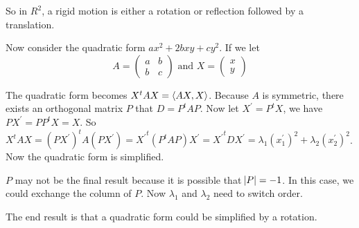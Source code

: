 So in $R^2$, a rigid motion is either a rotation or reflection followed by a translation.

\begin{example}
    Now consider the quadratic form $ax^2 + 2bxy + cy^2$. If we let 
\begin{equation}
    A = \begin{pmatrix}
        a & b \\
        b & c
    \end{pmatrix} \text{ and } X = \begin{pmatrix}
        x \\
        y
    \end{pmatrix}
\end{equation}

The quadratic form becomes $X^t A X = \left\langle \displaystyle AX, X \right\rangle$. Because $A$ is symmetric, there exists an orthogonal matrix $P$ that $D = P^t A P$. Now let $X^\prime = P^t X$, we have $PX^\prime = PP^tX = X$. So $X^t A X = (PX^\prime)^t A (PX^\prime) = {X^\prime}^t (P^t A P) X^\prime = {X^\prime}^t D X^\prime = \lambda_1 (x_1^\prime)^2 + \lambda_2 (x_2^\prime)^2$. Now the quadratic form is simplified.

$P$ may not be the final result because it is possible that $\abs{P} = -1$. In this case, we could exchange the column of $P$. Now $\lambda_1$ and $\lambda_2$ need to switch order.

The end result is that a quadratic form could be simplified by a rotation.
\end{example}
















































